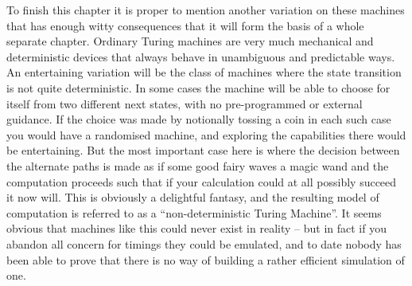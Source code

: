 To finish this chapter it is proper to mention another variation on
these machines that has enough witty consequences that it will form the
basis of a whole separate chapter. Ordinary Turing machines are very
much mechanical and deterministic devices that always behave in unambiguous
and predictable ways. An entertaining variation will be the class
of machines where the state transition is not quite deterministic. In
some cases the machine will be able to choose for itself from two
different next states, with no pre-programmed or external guidance.
If the choice was made by notionally tossing a coin in each such
case you would have a randomised machine, and exploring the capabilities
there would be entertaining. But the most important case here is where
the decision between the alternate paths is made as if some good fairy
waves a magic wand and the computation proceeds such that if your
calculation could at all possibly succeed it now will. This is obviously
a delightful fantasy, and the resulting model of computation is
referred to as a ``non-deterministic Turing Machine''. It seems obvious
that machines like this could never exist in reality -- but in fact
if you abandon all concern for timings they could be emulated, and
to date nobody has been able to prove that there is no way of building
a rather efficient simulation of one.


